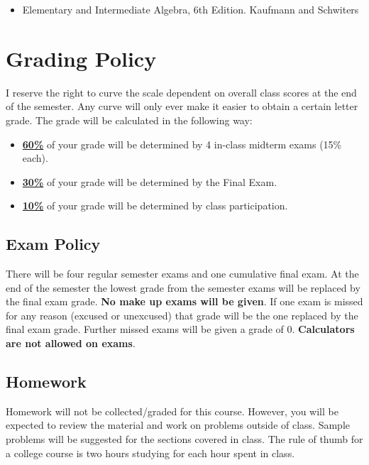 \documentclass[11pt]{article}
\begin{document}
\begin{itemize}
\item Elementary and Intermediate Algebra, 6th Edition. Kaufmann and Schwiters
\end{itemize}


\section*{Grading Policy}
I reserve the right to curve the scale dependent on overall class scores at the end of the semester. Any curve will only ever make it easier to obtain a certain letter grade. The grade will be calculated in the following way:
\begin{itemize}
	\item \underline{\textbf{60\%}} of your grade will be determined by 4 in-class midterm exams (15\% each).
	\item \underline{\textbf{30\%}} of your grade will be determined by the Final Exam.
	\item \underline{\textbf{10\%}} of your grade will be determined by class participation.
\end{itemize}

\subsection*{Exam Policy}
There will be four regular semester exams and one cumulative final exam. At the
end of the semester the lowest grade from the semester exams will be replaced by the final exam
grade. \textbf{No make up exams will be given}. If one exam is missed for any reason (excused or
unexcused) that grade will be the one replaced by the final exam grade. Further missed exams will
be given a grade of 0. \textbf{Calculators are not allowed on exams}.

\subsection*{Homework}
Homework will not be collected/graded for this course. However, you will be expected
to review the material and work on problems outside of class. Sample problems will be suggested
for the sections covered in class. The rule of thumb for a college course is two hours studying for
each hour spent in class.

\end{document}
